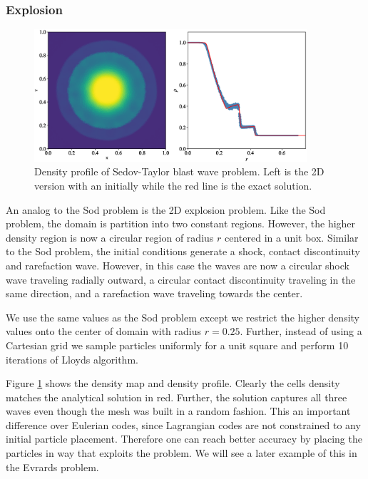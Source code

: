 \subsubsection{Explosion}
\begin{figure}
    \begin{center}
        \includegraphics[width=0.9\textwidth]{figures/explosion_2d.eps}
        \caption{Density profile of Sedov-Taylor blast wave problem. Left is the 2D version with an initially
        while the red line is the exact solution.}
        \label{fig.explosion_2d}
    \end{center}
\end{figure}
An analog to the Sod problem is the 2D explosion problem. Like the Sod problem, the domain
is partition into two constant regions. However, the higher density region is now a circular
region of radius $r$ centered in a unit box. Similar to the Sod problem, the initial 
conditions generate a shock, contact discontinuity and rarefaction wave. However, in this case
the waves are now a circular shock wave traveling radially outward, a circular contact
discontinuity traveling in the same direction, and a rarefaction wave traveling towards the
center.

We use the same values as the Sod problem except we restrict the higher density values onto
the center of domain with radius $r=0.25$. Further, instead of using a Cartesian grid we sample
particles uniformly for a unit square and perform 10 iterations of Lloyds algorithm. 

Figure \ref{fig.explosion_2d} shows the density map and density profile. Clearly the cells
density matches the analytical solution in red. Further, the solution captures all three waves
even though the mesh was built in a random fashion. This an important difference over Eulerian
codes, since Lagrangian codes are not constrained to any initial particle placement. Therefore
one can reach better accuracy by placing the particles in way that exploits the problem. We will
see a later example of this in the Evrards problem.

